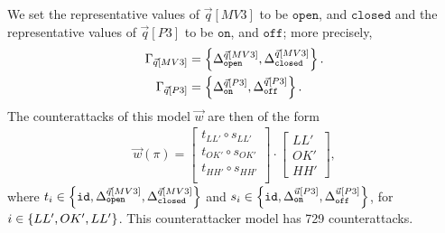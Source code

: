 {{We set the representative values of $\vec{q}[MV3]$ to be $\texttt{open}$, and $\texttt{closed}$ and the representative values of $\vec{q}[P3]$ to be $\texttt{on}$, and $\texttt{off}$; more precisely, 
\begin{align*}
  \Gamma_{\vec{q}[MV3]}&=\left\{{\Delta}^{\vec{q}[MV3]}_{\texttt{open}}, {\Delta}^{\vec{q}[MV3]}_{\texttt{closed}}\right\}.\\
  \Gamma_{\vec{q}[P3]}&=\left\{{\Delta}^{\vec{q}[P3]}_{\texttt{on}}, {\Delta}^{\vec{q}[P3]}_{\texttt{off}}\right\}.
\end{align*}
The counterattacks of this model $\vec{w}$ are then of the form
\begin{align*}
  \vec{w}(\pi)=
  \begin{bmatrix}
    t_{LL'}\circ s_{LL'} \\
    t_{OK'}\circ s_{OK'} \\
    t_{HH'}\circ s_{HH'} \\
  \end{bmatrix}
  \cdot
  \begin{bmatrix}
    LL' \\
    OK' \\
    HH'
  \end{bmatrix},
\end{align*} 
where $t_i\in \left\{{\texttt{id}},{\Delta}^{\vec{q}[MV3]}_{\texttt{open}}, {\Delta}^{\vec{q}[MV3]}_{\texttt{closed}}\right\}$ and  $s_i\in\left\{{\texttt{id}},{\Delta}^{\vec{u}[P3]}_{\texttt{on}}, {\Delta}^{\vec{u}[P3]}_{\texttt{off}}\right\}$, for $i\in \left\{LL',OK',LL'\right\}$. This counterattacker model has 729 counterattacks.



}}
